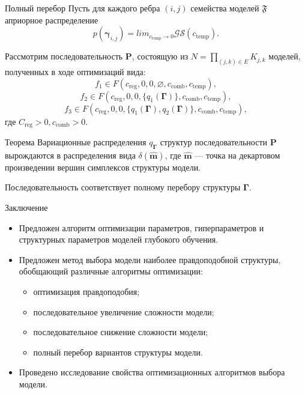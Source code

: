 \documentclass[usenames,dvipsnames,11pt,pdf,utf8,russian,aspectratio=169]{beamer}
\begin{document}
\begin{frame}{Полный перебор}
\small
Пусть для каждого ребра $(i,j)$ семейства моделей $\mathfrak{F}$ априорное распределение $$p(\boldsymbol{\gamma}_{i,j}) =  lim_{c_{\text{temp}} \to 0} \mathcal{GS}(c_{\text{temp}}).$$

Рассмотрим последовательность $\mathbf{P}$, состоящую из $N = \prod_{(j,k) \in E} K_{j,k}$ моделей, полученных в ходе оптимизаций вида:
$$f_1 \in F(c_{\text{reg}}, 0, 0, \varnothing, c_{\text{comb}},  c_{\text{temp}}),$$
$$f_2 \in F(c_{\text{reg}}, 0, 0, \{q_1(\boldsymbol{\Gamma})\},  c_{\text{comb}},  c_{\text{temp}}),$$
$$f_3 \in F(c_{\text{reg}}, 0, 0, \{q_1(\boldsymbol{\Gamma}), q_2(\boldsymbol{\Gamma})\},  c_{\text{comb}},  c_{\text{temp}}),$$
где $C_{\text{reg}} > 0,  c_{\text{comb}}>0$.


\begin{block}{Теорема}
Вариационные распределения $q_{\boldsymbol{\Gamma}}$ структур  последовательности $\mathbf{P}$ вырождаются в распределения вида $\delta(\hat{\mathbf{m}})$, где $\hat{\mathbf{m}}$ --- точка на декартовом произведении вершин симплексов структуры модели.

Последовательность соответствует полному перебору структуры $\boldsymbol{\Gamma}$.
\end{block}
\end{frame}


\begin{frame}{Заключение}
\begin{itemize}
\item Предложен алгоритм оптимизации параметров, гиперпараметров и структурных
параметров моделей глубокого обучения.
\item Предложен метод выбора модели наиболее правдоподобной структуры, обобщающий различные алгоритмы оптимизации:
\begin{itemize}
\item оптимизация правдоподобия;
\item последовательное увеличение сложности модели;
\item последовательное снижение сложности модели;
\item полный перебор вариантов структуры модели.
\end{itemize}
\item Проведено исследование свойства оптимизационных алгоритмов выбора модели.

\end{itemize}
\end{frame}
\end{document}
